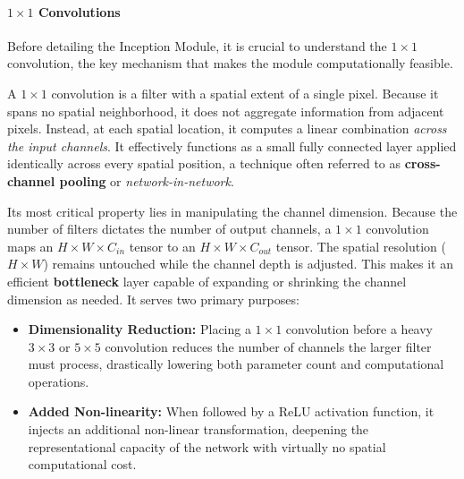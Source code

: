 \paragraph{$1 \times 1$ Convolutions}
Before detailing the Inception Module, it is crucial to understand the $1 \times 1$ convolution, the key mechanism that makes the module computationally feasible.

A $1 \times 1$ convolution is a filter with a spatial extent of a single pixel. Because it spans no spatial neighborhood, it does not aggregate information from adjacent pixels. Instead, at each spatial location, it computes a linear combination \emph{across the input channels}. It effectively functions as a small fully connected layer applied identically across every spatial position, a technique often referred to as \textbf{cross-channel pooling} or \textit{network-in-network}.

Its most critical property lies in manipulating the channel dimension. Because the number of filters dictates the number of output channels, a $1 \times 1$ convolution maps an $H \times W \times C_{in}$ tensor to an $H \times W \times C_{out}$ tensor. The spatial resolution ($H \times W$) remains untouched while the channel depth is adjusted. This makes it an efficient \textbf{bottleneck} layer capable of expanding or shrinking the channel dimension as needed. It serves two primary purposes:
\begin{itemize}
    \item \textbf{Dimensionality Reduction:} Placing a $1 \times 1$ convolution before a heavy $3 \times 3$ or $5 \times 5$ convolution reduces the number of channels the larger filter must process, drastically lowering both parameter count and computational operations.
    \item \textbf{Added Non-linearity:} When followed by a ReLU activation function, it injects an additional non-linear transformation, deepening the representational capacity of the network with virtually no spatial computational cost.
\end{itemize}

